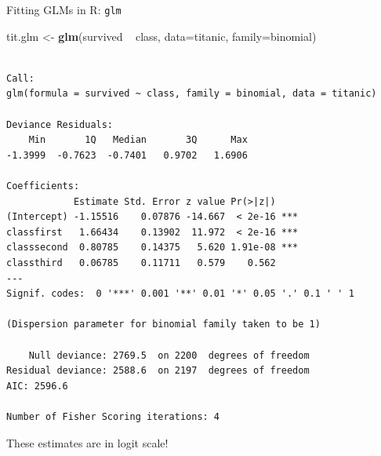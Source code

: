 \documentclass[10pt,ignorenonframetext,]{beamer}
\newenvironment{Shaded}{\begin{snugshade}}{\end{snugshade}}
\newcommand{\KeywordTok}[1]{\textcolor[rgb]{0.13,0.29,0.53}{\textbf{{#1}}}}
\newcommand{\DataTypeTok}[1]{\textcolor[rgb]{0.13,0.29,0.53}{{#1}}}
\newcommand{\StringTok}[1]{\textcolor[rgb]{0.31,0.60,0.02}{{#1}}}
\newcommand{\NormalTok}[1]{{#1}}
\begin{document}
\begin{frame}[fragile]{Fitting GLMs in R: \texttt{glm}}

\begin{Shaded}
\begin{Highlighting}[]
\NormalTok{tit.glm <-}\StringTok{ }\KeywordTok{glm}\NormalTok{(survived ~}\StringTok{ }\NormalTok{class, }\DataTypeTok{data=}\NormalTok{titanic, }\DataTypeTok{family=}\NormalTok{binomial)}
\end{Highlighting}
\end{Shaded}

\begin{verbatim}

Call:
glm(formula = survived ~ class, family = binomial, data = titanic)

Deviance Residuals: 
    Min       1Q   Median       3Q      Max  
-1.3999  -0.7623  -0.7401   0.9702   1.6906  

Coefficients:
            Estimate Std. Error z value Pr(>|z|)    
(Intercept) -1.15516    0.07876 -14.667  < 2e-16 ***
classfirst   1.66434    0.13902  11.972  < 2e-16 ***
classsecond  0.80785    0.14375   5.620 1.91e-08 ***
classthird   0.06785    0.11711   0.579    0.562    
---
Signif. codes:  0 '***' 0.001 '**' 0.01 '*' 0.05 '.' 0.1 ' ' 1

(Dispersion parameter for binomial family taken to be 1)

    Null deviance: 2769.5  on 2200  degrees of freedom
Residual deviance: 2588.6  on 2197  degrees of freedom
AIC: 2596.6

Number of Fisher Scoring iterations: 4
\end{verbatim}

These estimates are in logit scale!

\end{frame}
\end{document}
